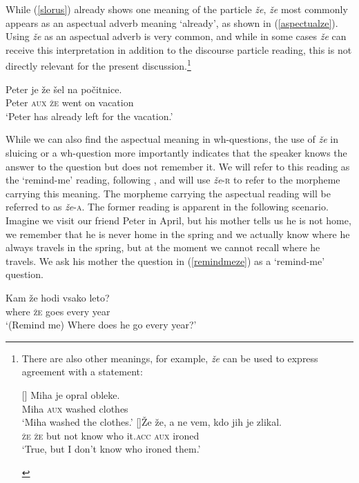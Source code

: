 \documentclass[output=paper,
modfonts,
newtxmath,
hidelinks
]{langscibook}
\begin{document}
\noindent While (\ref{slorus}) already shows one meaning of the particle \textit{že}, \textit{že} most commonly appears as an aspectual adverb meaning `already', as shown in (\ref{aspectualze}). Using \textit{že} as an aspectual adverb is very common, and while in some cases \textit{že} can receive this interpretation in addition to the discourse particle reading, this is not directly relevant for the present discussion.\footnote{There are also other meanings, for example, \textit{že} can be used to express agreement with a statement:

\ea
\begin{xlist}
[]{
\gll Miha je opral obleke.\\ 
Miha \textsc{aux} washed clothes\\
\glt `Miha washed the clothes.'}
[]{\gll Že že, a ne vem, kdo jih je zlikal.\\ 
\textsc{že} \textsc{že}	but not know who it.\textsc{acc} \textsc{aux} ironed\\
\glt `True, but I don't know who ironed them.'}
\end{xlist}
\zlast
}

\begin{exe} 
\ex \label{aspectualze}
\gll Peter 	je že šel na počitnice. \\
	Peter   \textsc{aux} \textsc{že} went on vacation\\
\trans `Peter has already left for the vacation.' 
\end{exe}

\noindent While we can also find the aspectual meaning in wh-questions, the use of \textit{že} in sluicing or a wh-question more importantly indicates that the speaker knows the answer to the question but does not remember it. We will refer to this reading as the `remind-me' reading, following \cite{sauerland2014wieder}, and will use \textit{že}-\textsc{r} to refer to the morpheme carrying this meaning. The morpheme carrying the aspectual reading will be referred to as \textit{že}-\textsc{a}. The former reading is apparent in the following scenario. Imagine we visit our friend Peter in April, but his mother tells us he is not home, we remember that he is never home in the spring and we actually know where he always travels in the spring, but at the moment we cannot recall where he travels. We ask his mother the question in (\ref{remindmeze}) as a `remind-me' question.

\begin{exe}
\ex \label{remindmeze}
\gll Kam že hodi vsako leto?\\
	where \textsc{že} goes every year\\
	\trans `(Remind me) Where does he go every year?'
\end{exe}
\end{document}
